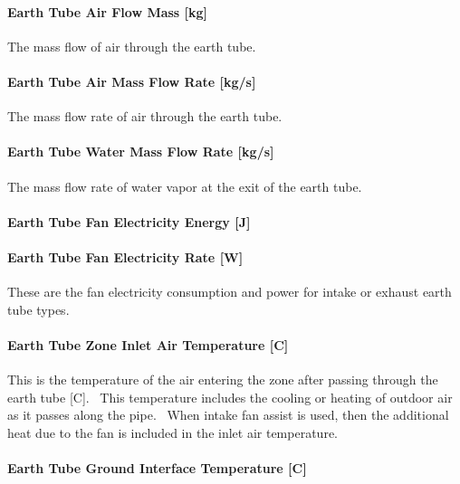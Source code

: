 \paragraph{Earth Tube Air Flow Mass {[}kg{]}}\label{earth-tube-air-flow-mass-kg}

The mass flow of air through the earth tube.

\paragraph{Earth Tube Air Mass Flow Rate {[}kg/s{]}}\label{earth-tube-air-mass-flow-rate-kgs}

The mass flow rate of air through the earth tube.

\paragraph{Earth Tube Water Mass Flow Rate {[}kg/s{]}}\label{earth-tube-water-mass-flow-rate-kgs}

The mass flow rate of water vapor at the exit of the earth tube.

\paragraph{Earth Tube Fan Electricity Energy {[}J{]}}\label{earth-tube-fan-electric-energy-j}

\paragraph{Earth Tube Fan Electricity Rate {[}W{]}}\label{earth-tube-fan-electric-power-w}

These are the fan electricity consumption and power for intake or exhaust earth tube types.

\paragraph{Earth Tube Zone Inlet Air Temperature {[}C{]}}\label{earth-tube-zone-inlet-air-temperature-c}

This is the temperature of the air entering the zone after passing through the earth tube {[}C{]}.~ This temperature includes the cooling or heating of outdoor air as it passes along the pipe. ~When intake fan assist is used, then the additional heat due to the fan is included in the inlet air temperature.

\paragraph{Earth Tube Ground Interface Temperature {[}C{]}}\label{earth-tube-ground-interface-temperature-c}

